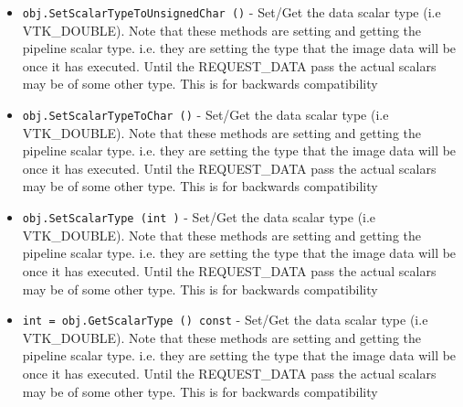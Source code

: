 \begin{itemize}
\item  \verb|obj.SetScalarTypeToUnsignedChar ()| -  Set/Get the data scalar type (i.e VTK\_DOUBLE). Note that these methods
 are setting and getting the pipeline scalar type. i.e. they are setting
 the type that the image data will be once it has executed. Until the
 REQUEST\_DATA pass the actual scalars may be of some other type. This is
 for backwards compatibility

\item  \verb|obj.SetScalarTypeToChar ()| -  Set/Get the data scalar type (i.e VTK\_DOUBLE). Note that these methods
 are setting and getting the pipeline scalar type. i.e. they are setting
 the type that the image data will be once it has executed. Until the
 REQUEST\_DATA pass the actual scalars may be of some other type. This is
 for backwards compatibility

\item  \verb|obj.SetScalarType (int )| -  Set/Get the data scalar type (i.e VTK\_DOUBLE). Note that these methods
 are setting and getting the pipeline scalar type. i.e. they are setting
 the type that the image data will be once it has executed. Until the
 REQUEST\_DATA pass the actual scalars may be of some other type. This is
 for backwards compatibility

\item  \verb|int = obj.GetScalarType () const| -  Set/Get the data scalar type (i.e VTK\_DOUBLE). Note that these methods
 are setting and getting the pipeline scalar type. i.e. they are setting
 the type that the image data will be once it has executed. Until the
 REQUEST\_DATA pass the actual scalars may be of some other type. This is
 for backwards compatibility

\end{itemize}
